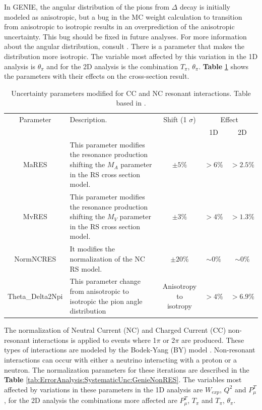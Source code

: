 In GENIE, the angular distribution of the pions from $\Delta$ decay is initially modeled as anisotropic, but a bug in the MC weight calculation to transition from anisotropic to isotropic results in an overprediction of the anisotropic uncertainty. This bug should be fixed in future analyses. For more information about the angular distribution, consult \cite{Genie}. There is a parameter that makes the distribution more isotropic. The variable most affected by this variation in the 1D analysis is $\theta_\pi$ and for the 2D analysis is the combination $T_\pi$, $\theta_\pi$. \textbf{Table} \ref{tab:ErrorAnalysis:SystematicUnc:GenieRESmodels} shows the parameters with their effects on the cross-section result.

\begin{table}[!htb]
    \centering
    \begin{tabular}{c|p{1.8in}|c|c|c}
        \hline 
        Parameter & Description.  & Shift (1 $\sigma$) & \multicolumn{2}{c}{Effect} \\
         & & & 1D & 2D \\
        \hline 
        MaRES & This parameter modifies the resonance production shifting the $M_A$ parameter in the RS cross section model. & $\pm5\%$ & $>6\%$ & $>2.5\%$ \\ \hline
        MvRES & This parameter modifies the resonance production shifting the $M_V$ parameter in the RS cross section model. & $\pm3\%$ & $>4\%$ & $>1.3\%$\\ \hline
        NormNCRES & It modifies the normalization of the NC RS model. & $\pm20\%$ & $\sim 0\%$ & $\sim0\%$ \\ \hline
        Theta\_Delta2Npi & This parameter change from anisotropic to isotropic the pion angle distribution & \makecell{Anisotropy to \\ isotropy} & $>4\%$ & $>6.9\%$ \\ \hline
    \end{tabular}
    \caption{Uncertainty parameters modified for CC and NC resonant interactions. Table based in \cite{GENIEUnc}.}
    \label{tab:ErrorAnalysis:SystematicUnc:GenieRESmodels}
\end{table}

The normalization of Neutral Current (NC) and Charged Current (CC) non-resonant interactions is applied to events where 1$\pi$ or 2$\pi$ are produced. These types of interactions are modeled by the Bodek-Yang (BY) model \cite{Yang_2009}. Non-resonant interactions can occur with either a neutrino interacting with a proton or a neutron. The normalization parameters for these iterations are described in the \textbf{Table} \ref{tab:ErrorAnalysis:SystematicUnc:GenieNonRES}. The variables most affected by variations in these parameters in the 1D analysis are $W_{exp}$, $Q^2$ and $P^T_\mu$, for the 2D analysis the combinations more affected are $P^T_\mu$, $T_\pi$ and $T_\pi$, $\theta_\pi$.


